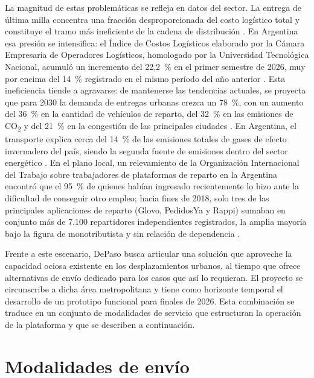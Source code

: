 {\color{nuevo}La magnitud de estas problemáticas se refleja en datos del sector. La entrega de última milla concentra una fracción desproporcionada del costo logístico total y constituye el tramo más ineficiente de la cadena de distribución \parencite{YangEtAl2022}. En Argentina esa presión se intensifica: el Índice de Costos Logísticos elaborado por la Cámara Empresaria de Operadores Logísticos, homologado por la Universidad Tecnológica Nacional, acumuló un incremento del 22,2~\% en el primer semestre de 2026, muy por encima del 14~\% registrado en el mismo período del año anterior \parencite{CEDOL2025}. Esta ineficiencia tiende a agravarse: de mantenerse las tendencias actuales, se proyecta que para 2030 la demanda de entregas urbanas crezca un 78~\%, con un aumento del 36~\% en la cantidad de vehículos de reparto, del 32~\% en las emisiones de CO\textsubscript{2} y del 21~\% en la congestión de las principales ciudades \parencite{WEF2020}. En Argentina, el transporte explica cerca del 14~\% de las emisiones totales de gases de efecto invernadero del país, siendo la segunda fuente de emisiones dentro del sector energético \parencite{InventarioGEI2024}. En el plano local, un relevamiento de la Organización Internacional del Trabajo sobre trabajadores de plataformas de reparto en la Argentina encontró que el 95~\% de quienes habían ingresado recientemente lo hizo ante la dificultad de conseguir otro empleo; hacia fines de 2018, solo tres de las principales aplicaciones de reparto (Glovo, PedidosYa y Rappi) sumaban en conjunto más de 7.100 repartidores independientes registrados, la amplia mayoría bajo la figura de monotributista y sin relación de dependencia \parencite{OIT2020}.}

Frente a este escenario, DePaso busca articular una solución que aproveche la capacidad ociosa existente en los desplazamientos urbanos, al tiempo que ofrece alternativas de envío dedicado para los casos que así lo requieran. El proyecto se circunscribe a dicha área metropolitana y tiene como horizonte temporal el desarrollo de un prototipo funcional para finales de 2026. Esta combinación se traduce en un conjunto de modalidades de servicio que estructuran la operación de la plataforma y que se describen a continuación.

\section{Modalidades de envío}


